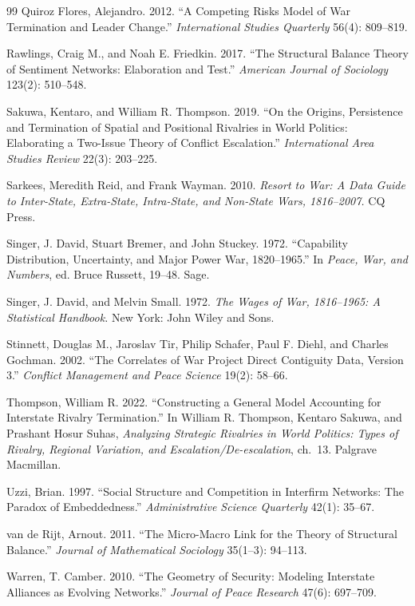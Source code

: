 \documentclass[Afour,sageh,times,doublespace]{sagej}
\begin{document}
\begin{thebibliography}{99}
 Quiroz Flores, Alejandro. 2012. ``A Competing Risks Model of War Termination and Leader Change.'' \emph{International Studies Quarterly} 56(4): 809--819.

 Rawlings, Craig M., and Noah E. Friedkin. 2017. ``The Structural Balance Theory of Sentiment Networks: Elaboration and Test.'' \emph{American Journal of Sociology} 123(2): 510--548.

 Sakuwa, Kentaro, and William R. Thompson. 2019. ``On the Origins, Persistence and Termination of Spatial and Positional Rivalries in World Politics: Elaborating a Two-Issue Theory of Conflict Escalation.'' \emph{International Area Studies Review} 22(3): 203--225.

 Sarkees, Meredith Reid, and Frank Wayman. 2010. \emph{Resort to War: A Data Guide to Inter-State, Extra-State, Intra-State, and Non-State Wars, 1816--2007.} CQ Press.

 Singer, J. David, Stuart Bremer, and John Stuckey. 1972. ``Capability Distribution, Uncertainty, and Major Power War, 1820--1965.'' In \emph{Peace, War, and Numbers}, ed. Bruce Russett, 19--48. Sage.

 Singer, J. David, and Melvin Small. 1972. \emph{The Wages of War, 1816--1965: A Statistical Handbook.} New York: John Wiley and Sons.

 Stinnett, Douglas M., Jaroslav Tir, Philip Schafer, Paul F. Diehl, and Charles Gochman. 2002. ``The Correlates of War Project Direct Contiguity Data, Version 3.'' \emph{Conflict Management and Peace Science} 19(2): 58--66.

 Thompson, William R. 2022. ``Constructing a General Model Accounting for Interstate Rivalry Termination.'' In William R. Thompson, Kentaro Sakuwa, and Prashant Hosur Suhas, \emph{Analyzing Strategic Rivalries in World Politics: Types of Rivalry, Regional Variation, and Escalation/De-escalation}, ch.~13. Palgrave Macmillan.

 Uzzi, Brian. 1997. ``Social Structure and Competition in Interfirm Networks: The Paradox of Embeddedness.'' \emph{Administrative Science Quarterly} 42(1): 35--67.

 van de Rijt, Arnout. 2011. ``The Micro-Macro Link for the Theory of Structural Balance.'' \emph{Journal of Mathematical Sociology} 35(1--3): 94--113.

 Warren, T. Camber. 2010. ``The Geometry of Security: Modeling Interstate Alliances as Evolving Networks.'' \emph{Journal of Peace Research} 47(6): 697--709.

\end{thebibliography}
\end{document}
